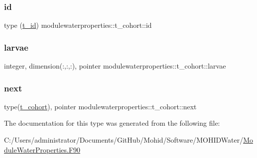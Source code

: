 \subsubsection{\texorpdfstring{id}{id}}
{\footnotesize\ttfamily type (\mbox{\hyperlink{structmodulewaterproperties_1_1t__id}{t\+\_\+id}}) modulewaterproperties\+::t\+\_\+cohort\+::id\hspace{0.3cm}{\ttfamily [private]}}

\mbox{\label{structmodulewaterproperties_1_1t__cohort_a6bae82409568a75372c6dc3bd5b8f521}} 
\subsubsection{\texorpdfstring{larvae}{larvae}}
{\footnotesize\ttfamily integer, dimension(\+:,\+:,\+:), pointer modulewaterproperties\+::t\+\_\+cohort\+::larvae\hspace{0.3cm}{\ttfamily [private]}}

\mbox{\label{structmodulewaterproperties_1_1t__cohort_a9bd8936e14787c0c2354cfbd51a420ea}} 
\subsubsection{\texorpdfstring{next}{next}}
{\footnotesize\ttfamily type(\mbox{\hyperlink{structmodulewaterproperties_1_1t__cohort}{t\+\_\+cohort}}), pointer modulewaterproperties\+::t\+\_\+cohort\+::next\hspace{0.3cm}{\ttfamily [private]}}



The documentation for this type was generated from the following file\+:\begin{DoxyCompactItemize}
\item 
C\+:/\+Users/administrator/\+Documents/\+Git\+Hub/\+Mohid/\+Software/\+M\+O\+H\+I\+D\+Water/\mbox{\hyperlink{_module_water_properties_8_f90}{Module\+Water\+Properties.\+F90}}\end{DoxyCompactItemize}
